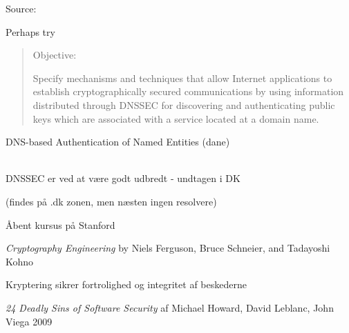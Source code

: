 \documentclass[20pt,landscape,a4paper,footrule]{foils}
\begin{document}
Source:\\
{\small{}}

Perhaps try 



\begin{quote}
Objective:

Specify mechanisms and techniques that allow Internet applications to
establish cryptographically secured communications by using information
distributed through DNSSEC for discovering and authenticating public
keys which are associated with a service located at a domain name.
\end{quote}

DNS-based Authentication of Named Entities (dane)\\
\\
{\footnotesize {}}

\vskip 2cm

\centerline{\Large DNSSEC er ved at være godt udbredt - undtagen i DK}
(findes på .dk zonen, men næsten ingen resolvere)





Åbent kursus på Stanford\\



\emph{Cryptography Engineering} by
Niels Ferguson, Bruce Schneier, and Tadayoshi Kohno

\centerline{Kryptering sikrer fortrolighed og integritet af beskederne}



\emph{24 Deadly Sins of Software Security} af Michael Howard, David Leblanc, John Viega 2009
\end{document}
